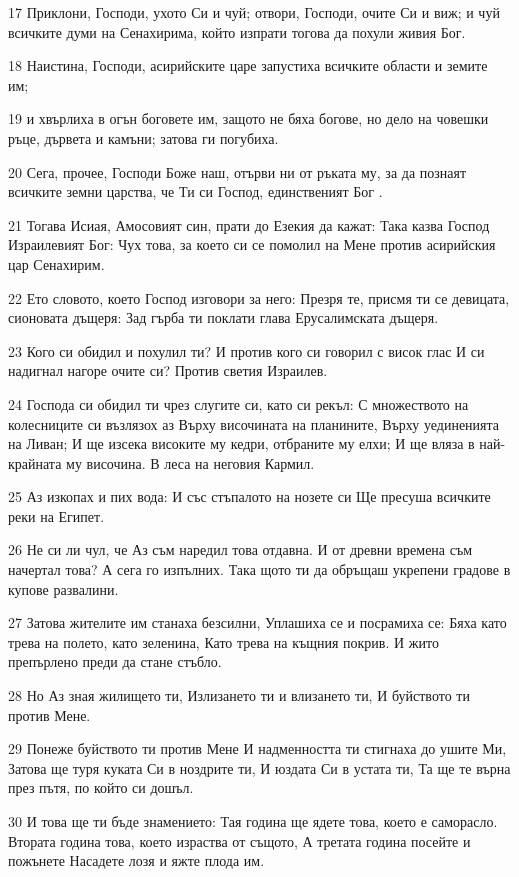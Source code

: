 \par 17 Приклони, Господи, ухото Си и чуй; отвори, Господи, очите Си и виж; и чуй всичките думи на Сенахирима, който изпрати тогова да похули живия Бог.
\par 18 Наистина, Господи, асирийските царе запустиха всичките области и земите им;
\par 19 и хвърлиха в огън боговете им, защото не бяха богове, но дело на човешки ръце, дървета и камъни; затова ги погубиха.
\par 20 Сега, прочее, Господи Боже наш, отърви ни от ръката му, за да познаят всичките земни царства, че Ти си Господ, единственият Бог .
\par 21 Тогава Исиая, Амосовият син, прати до Езекия да кажат: Така казва Господ Израилевият Бог: Чух това, за което си се помолил на Мене против асирийския цар Сенахирим.
\par 22 Ето словото, което Господ изговори за него: Презря те, присмя ти се девицата, сионовата дъщеря: Зад гърба ти поклати глава Ерусалимската дъщеря.
\par 23 Кого си обидил и похулил ти? И против кого си говорил с висок глас И си надигнал нагоре очите си? Против светия Израилев.
\par 24 Господа си обидил ти чрез слугите си, като си рекъл: С множеството на колесниците си възлязох аз Върху височината на планините, Върху уединенията на Ливан; И ще изсека високите му кедри, отбраните му елхи; И ще вляза в най-крайната му височина. В леса на неговия Кармил.
\par 25 Аз изкопах и пих вода: И със стъпалото на нозете си Ще пресуша всичките реки на Египет.
\par 26 Не си ли чул, че Аз съм наредил това отдавна. И от древни времена съм начертал това? А сега го изпълних. Така щото ти да обръщаш укрепени градове в купове развалини.
\par 27 Затова жителите им станаха безсилни, Уплашиха се и посрамиха се: Бяха като трева на полето, като зеленина, Като трева на къщния покрив. И жито препърлено преди да стане стъбло.
\par 28 Но Аз зная жилището ти, Излизането ти и влизането ти, И буйството ти против Мене.
\par 29 Понеже буйството ти против Мене И надменността ти стигнаха до ушите Ми, Затова ще туря куката Си в ноздрите ти, И юздата Си в устата ти, Та ще те върна през пътя, по който си дошъл.
\par 30 И това ще ти бъде знамението: Тая година ще ядете това, което е саморасло. Втората година това, което израства от същото, А третата година посейте и пожънете Насадете лозя и яжте плода им.

